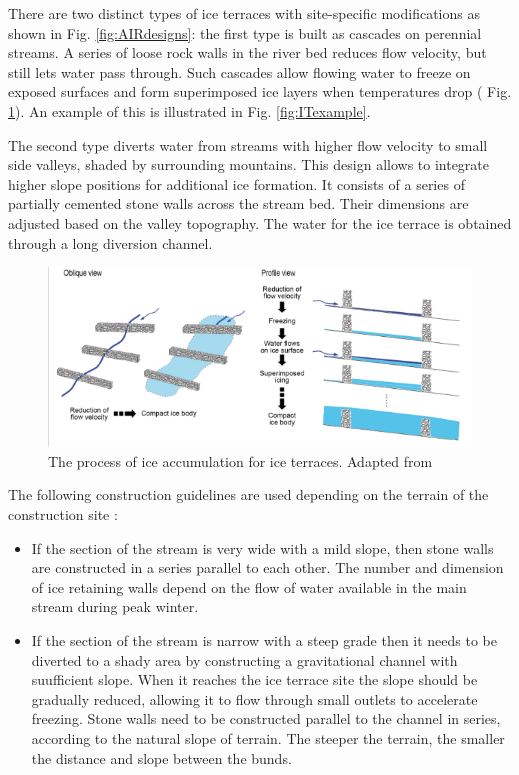 There are two distinct types of ice terraces with site-specific modifications as shown in Fig.
\ref{fig:AIRdesigns}: the first type is built as cascades on perennial streams. A series of loose rock walls in
the river bed reduces flow velocity, but still lets water pass through. Such cascades allow flowing water to
freeze on exposed surfaces and form superimposed ice layers when temperatures drop ( Fig.
\ref{fig:ITscience}). An example of this is illustrated in Fig. \ref{fig:ITexample}.

The second type diverts water from streams with higher flow velocity to small side valleys, shaded by
surrounding mountains. This design allows to integrate higher slope positions for additional ice formation. It
consists of a series of partially cemented stone walls across the stream bed. Their dimensions are adjusted
based on the valley topography. The water for the ice terrace is obtained through a long diversion channel.

\begin{figure}[htb]
\centering
\includegraphics[width=\textwidth]{figs/IT_science.png}

\caption{ The process of ice accumulation for ice terraces. Adapted from
\citet{nusserSociohydrologyArtificialGlaciers2019}}

\label{fig:ITscience}
\end{figure}

The following construction guidelines are used depending on the terrain of the construction site
\citep{norphelSnowWaterHarvesting2015}:

\begin{itemize}

  \item If the section of the stream is very wide with a mild slope, then stone walls are
    constructed in a series parallel to each other. The number and dimension of ice retaining walls depend on
    the flow of water available in the main stream during peak winter.

  \item If the section of the stream is narrow with a steep grade then it needs to be diverted to a shady area
    by constructing a gravitational channel with suufficient slope. When it reaches the ice terrace site the
    slope should be gradually reduced, allowing it to flow through small outlets to accelerate freezing. Stone
    walls need to be constructed parallel to the channel in series, according to the natural slope of terrain.
    The steeper the terrain, the smaller the distance and slope between the bunds.

\end{itemize}


